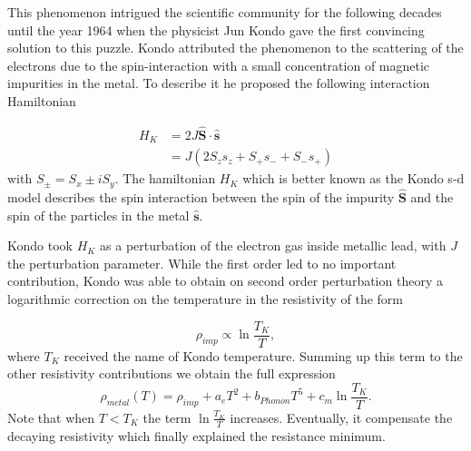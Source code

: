 This phenomenon intrigued the scientific community for the following decades until the year 1964 when the physicist  Jun Kondo gave the first convincing solution to this puzzle. Kondo attributed the phenomenon to the scattering of the electrons due to the spin-interaction with a small concentration of magnetic impurities in the metal. To describe it he proposed the following interaction Hamiltonian


\begin{align}
H_K &= 2J\hat{\textbf{S}}\cdot \hat{\textbf{s}} \\
&=  J (2S_z s_z + S_+s_- +S_-s_+)
\end{align}
with $S_\pm = S_x \pm iS_y$. The hamiltonian $H_K$ which is better known as the Kondo s-d model describes the spin interaction between the spin of the impurity $\hat{\textbf{S}}$ and the spin of the particles in the metal $\hat{\textbf{s}}$.


Kondo took $H_K$ as a perturbation of the electron gas inside metallic lead, with $J$ the perturbation parameter. While the first order led to no important contribution, Kondo was able to obtain on second order perturbation theory a logarithmic correction on the temperature in the resistivity of the form 

\begin{equation}
\rho_{imp} \propto \ln{\frac {
T_K }{T}},
\end{equation}
where $T_K$ received the name of Kondo temperature. Summing up this term to the other resistivity contributions we obtain the full expression 
\begin{equation}
{\displaystyle \rho_{metal} (T)=\rho_{imp}+a_{e}T^{2}+b_{Phonon}T^{5} + c_{m}\ln {\frac {
T_K }{T}}}.
\label{logKondo}
\end{equation}
\noindent Note that when $T< T_K$ the term $ \ln {\frac {
T_K }{T}}$ increases. Eventually, it compensate the decaying resistivity which finally explained the  resistance minimum. 

